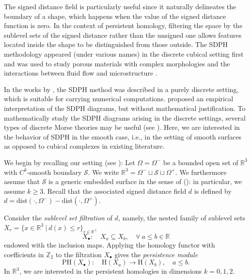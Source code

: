 \documentclass[11pt]{article}
\newcommand{\R}{\mathbb{R}}
\newcommand{\PH}{\mathrm{PH}}
\newcommand{\W}{\Omega}
\newcommand{\Xb}{X_\bullet}
\newcommand{\dist}{\mathrm{dist}}
\newcommand{\Surf}{\mathcal{S}}
\renewcommand{\H}{\mathrm{H}}
\theoremstyle{plain}
\theoremstyle{definition}
\theoremstyle{remark}
\begin{document}
	The signed distance field is particularly useful since it naturally delineates the boundary of a shape, which happens when the value of the signed distance function is zero.  In the context of persistent homology, filtering the space by the sublevel sets of the signed distance rather than the unsigned one allows features located inside the shape to be distinguished from those outside.  The SDPH methodology appeared (under various names) in the discrete cubical setting first and was used to study porous materials with complex morphologies \citep{delgado-friedrichs_morse_2014, delgado-friedrichs_skeletonization_2015} and the interactions between fluid flow and microstructure \citep{herring_topological_2019, moon_statistical_2019}.
	
	In the works by \cite{delgado-friedrichs_morse_2014, delgado-friedrichs_skeletonization_2015,herring_topological_2019, moon_statistical_2019}, the SDPH method was described in a purely discrete setting, which is suitable for carrying numerical computations. \cite{herring_topological_2019, moon_statistical_2019} proposed an empirical interpretation of the SDPH diagrams, but without mathematical justification. 
	To mathematically study the SDPH diagrams arising in the discrete settings, several types of discrete Morse theories may be useful \citep{banchoff_critical_1967, forman_morse_1998} (see \citep{lewiner_critical_2013, bloch_polyhedral_2013, bauer_persistence_2011, saucan_discrete_2020}).
	Here, we are interested in the behavior of SDPH in the smooth case, i.e., in the setting of smooth surfaces as opposed to cubical complexes in existing literature. 
	
	We begin by recalling our setting (see ): Let $\W = \W^-$ be a bounded open set of $\R^3$ with $C^k$-smooth boundary $\Surf$. We write $\R^3 = \W^- \sqcup \Surf \sqcup \W^+$. We furthermore assume that $\Surf$ is a generic embedded surface in the sense of  (): in particular, we assume $k \geq 3$. Recall that the associated signed distance field $d$ is defined by $d = \dist(\cdot, \W^-) - \dist(\cdot, \W^+)$.
	
	
	Consider the \textit{sublevel set filtration} of $d$, namely, the nested family of sublevel sets $X_r = \{x \in \R^3 ~|~ d(x) \leq r\}_{r \in \R}$,
	\[\Xb : \quad X_a \subseteq X_b, \quad \forall\ a \leq b \in \R\]
	endowed with the inclusion maps.
	Applying the homology functor with coefficients in $\mathbb{Z}_2$ to the filtration $\Xb$ gives the \textit{persistence module}
	\[\PH(\Xb) : \quad \H(X_a) \to \H(X_{b}), \quad a \leq b.\]
	In $\R^3$, we are interested in the persistent homologies in dimensions $k = 0, 1, 2$.
	
\end{document}
